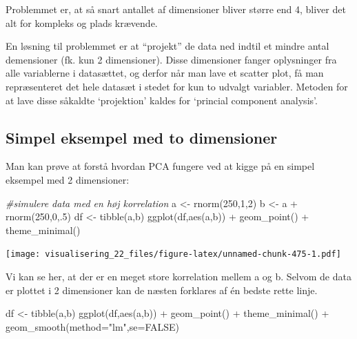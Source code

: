 \documentclass[
]{book}
\newenvironment{Shaded}{\begin{snugshade}}{\end{snugshade}}
\newcommand{\AttributeTok}[1]{\textcolor[rgb]{0.77,0.63,0.00}{#1}}
\newcommand{\CommentTok}[1]{\textcolor[rgb]{0.56,0.35,0.01}{\textit{#1}}}
\newcommand{\ConstantTok}[1]{\textcolor[rgb]{0.00,0.00,0.00}{#1}}
\newcommand{\DecValTok}[1]{\textcolor[rgb]{0.00,0.00,0.81}{#1}}
\newcommand{\FunctionTok}[1]{\textcolor[rgb]{0.00,0.00,0.00}{#1}}
\newcommand{\NormalTok}[1]{#1}
\newcommand{\OtherTok}[1]{\textcolor[rgb]{0.56,0.35,0.01}{#1}}
\newcommand{\SpecialCharTok}[1]{\textcolor[rgb]{0.00,0.00,0.00}{#1}}
\newcommand{\StringTok}[1]{\textcolor[rgb]{0.31,0.60,0.02}{#1}}
\begin{document}
Problemmet er, at så snart antallet af dimensioner bliver større end 4, bliver det alt for kompleks og plads krævende.

En løsning til problemmet er at ``projekt'' de data ned indtil et mindre antal demensioner (fk. kun 2 dimensioner). Disse dimensioner fanger oplysninger fra alle variablerne i datasættet, og derfor når man lave et scatter plot, få man repræsenteret det hele datasæt i stedet for kun to udvalgt variabler. Metoden for at lave disse såkaldte `projektion' kaldes for `princial component analysis'.

\hypertarget{simpel-eksempel-med-to-dimensioner}{%
\subsection{Simpel eksempel med to dimensioner}\label{simpel-eksempel-med-to-dimensioner}}

Man kan prøve at forstå hvordan PCA fungere ved at kigge på en simpel eksempel med 2 dimensioner:

\begin{Shaded}
\begin{Highlighting}[]
\CommentTok{\#simulere data med en høj korrelation}
\NormalTok{a }\OtherTok{\textless{}{-}} \FunctionTok{rnorm}\NormalTok{(}\DecValTok{250}\NormalTok{,}\DecValTok{1}\NormalTok{,}\DecValTok{2}\NormalTok{)}
\NormalTok{b }\OtherTok{\textless{}{-}}\NormalTok{ a }\SpecialCharTok{+} \FunctionTok{rnorm}\NormalTok{(}\DecValTok{250}\NormalTok{,}\DecValTok{0}\NormalTok{,.}\DecValTok{5}\NormalTok{)}
\NormalTok{df }\OtherTok{\textless{}{-}} \FunctionTok{tibble}\NormalTok{(a,b)}
\FunctionTok{ggplot}\NormalTok{(df,}\FunctionTok{aes}\NormalTok{(a,b)) }\SpecialCharTok{+} 
  \FunctionTok{geom\_point}\NormalTok{() }\SpecialCharTok{+} 
  \FunctionTok{theme\_minimal}\NormalTok{()}
\end{Highlighting}
\end{Shaded}

\texttt{[image: visualisering\_22\_files/figure-latex/unnamed-chunk-475-1.pdf]}

Vi kan se her, at der er en meget store korrelation mellem a og b. Selvom de data er plottet i 2 dimensioner kan de næsten forklares af én bedste rette linje.

\begin{Shaded}
\begin{Highlighting}[]
\NormalTok{df }\OtherTok{\textless{}{-}} \FunctionTok{tibble}\NormalTok{(a,b)}
\FunctionTok{ggplot}\NormalTok{(df,}\FunctionTok{aes}\NormalTok{(a,b)) }\SpecialCharTok{+} 
  \FunctionTok{geom\_point}\NormalTok{() }\SpecialCharTok{+} 
  \FunctionTok{theme\_minimal}\NormalTok{() }\SpecialCharTok{+} 
  \FunctionTok{geom\_smooth}\NormalTok{(}\AttributeTok{method=}\StringTok{"lm"}\NormalTok{,}\AttributeTok{se=}\ConstantTok{FALSE}\NormalTok{)}
\end{Highlighting}
\end{Shaded}
\end{document}
